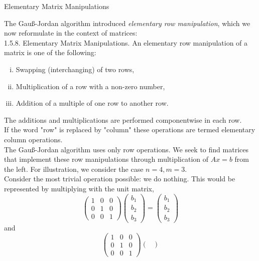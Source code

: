 \documentclass[smaller,hyperref={CJKbookmarks=true}]{beamer}
\begin{document}
\begin{frame}{Elementary Matrix Manipulations}
\begin{spacing}{1}
The Gau\ss-Jordan algorithm introduced \emph{elementary row manipulation}, which we now reformulate in the context of matrices:\\[9pt]
\alert{1.5.8. Elementary Matrix Manipulations.} An elementary row manipulation of a matrix is one of the following:
\begin{enumerate}[(i)]
  \item Swapping (interchanging) of two rows,
  \item Multiplication of a row with a non-zero number,
  \item Addition of a multiple of one row to another row.
\end{enumerate}
The additions and multiplications are performed componentwise in each
row.\\[8pt]
If the word "row" is replaced by "column" these operations are termed
elementary column operations.\\[7pt]
The Gau\ss-Jordan algorithm uses only row operations. We seek to find
matrices that implement these row manipulations through multiplication of
$Ax=b$ from the left.
\newpage
For illustration, we consider the case $n=4, m=3$.\\[8pt]
Consider the most trivial operation possible: we do nothing. This would be
represented by multiplying with the unit matrix,
\[\begin{pmatrix}
    1 & 0 & 0 \\
    0 & 1 & 0 \\
    0 & 0 & 1
  \end{pmatrix}\begin{pmatrix}
                 b_1 \\
                 b_2 \\
                 b_3
               \end{pmatrix}=\begin{pmatrix}
                 b_1 \\
                 b_2 \\
                 b_3
               \end{pmatrix}\]
and
\[\begin{pmatrix}
    1 & 0 & 0 \\
    0 & 1 & 0 \\
    0 & 0 & 1
  \end{pmatrix}\begin{pmatrix}

\end{pmatrix}\]
\end{spacing}
\end{frame}
\end{document}
